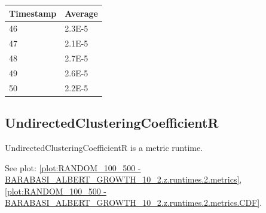 \begin{tabular}{|l||l|}
\hline
	\textbf{Timestamp} & \textbf{Average} \\ \hline
	46 & 2.3E-5 \\ \hline
	47 & 2.1E-5 \\ \hline
	48 & 2.7E-5 \\ \hline
	49 & 2.6E-5 \\ \hline
	50 & 2.2E-5 \\ \hline
\end{tabular}

\subsection{UndirectedClusteringCoefficientR}
UndirectedClusteringCoefficientR is a metric runtime.

See plot: \ref{plot:RANDOM_100_500 - BARABASI_ALBERT_GROWTH_10_2.z.runtimes.2.metrics}, \ref{plot:RANDOM_100_500 - BARABASI_ALBERT_GROWTH_10_2.z.runtimes.2.metrics.CDF}.

